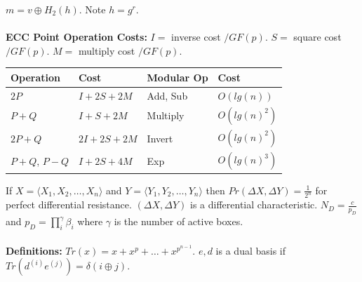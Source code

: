 $m= v \oplus H_2(h)$.  Note $h= g^r$.
\\
\\
{\bf ECC Point Operation Costs:}
$I= $ inverse cost $/GF(p)$.
$S= $ square cost $/GF(p)$.
$M= $ multiply cost $/GF(p)$.
\begin{center}
\begin{tabular} {|l|l||l|l|}
\hline
{\bf Operation} & {\bf Cost} & {\bf Modular Op} & {\bf Cost}\\
\hline
$2P$ & $I+2S+2M$ & Add, Sub & $O(lg(n))$ \\
$P+Q$ & $I + S+ 2M$ & Multiply & $O(lg(n)^2)$ \\
$2P+Q$ & $2I + 2S + 2M$ & Invert & $O(lg(n)^2)$ \\
$P+Q$, $P-Q$ & $I+2S+4M$ & Exp & $O(lg(n)^3)$ \\
\hline
\end{tabular}
\end{center}
If $X= \langle X_1, X_2, \ldots, X_n \rangle$ and
$Y= \langle Y_1, Y_2, \ldots, Y_n \rangle$ then 
$Pr(\Delta X, \Delta Y)= {\frac 1 {2^n}}$ for
perfect differential resistance.
$(\Delta X, \Delta Y)$ is a differential characteristic.  $N_D= {\frac c {p_D}}$ and
$p_D= \prod_i^{\gamma} \beta_i$ where $\gamma$ is the number of active boxes.  
\\
\\
{\bf  Definitions:}
$Tr(x)= x+ x^p + \ldots + x^{p^{n-1}}$.  
$e, d$ is a dual basis if $Tr(d^{(i)} e^{(j)})= \delta(i \oplus j)$.
